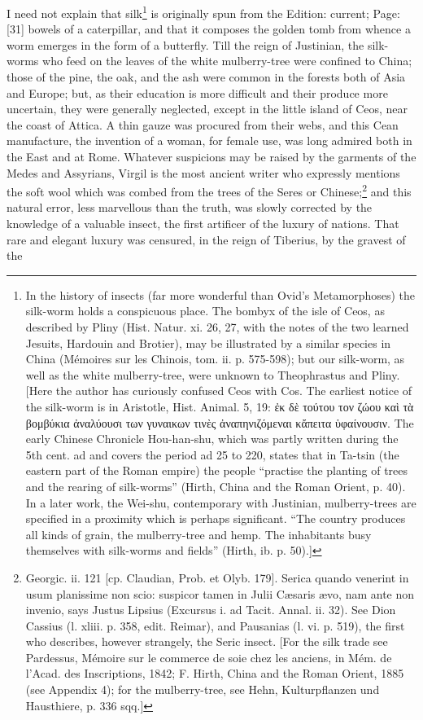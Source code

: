 I need not explain that silk\footnote{In the history of insects (far more wonderful than Ovid\texthebrew{}’s Metamorphoses) the silk-worm holds a conspicuous place. The bombyx of the isle of Ceos, as described by Pliny (Hist. Natur. xi. 26, 27, with the notes of the two learned Jesuits, Hardouin and Brotier), may be illustrated by a similar species in China (Mémoires sur les Chinois, tom. ii. p. 575-598); but our silk-worm, as well as the white mulberry-tree, were unknown to Theophrastus and Pliny. [Here the author has curiously confused Ceos with Cos. The earliest notice of the silk-worm is in Aristotle, Hist. Animal. 5, 19: \textgreek{\texthebrew{ἐ}κ δ\texthebrew{ὲ} τούτου τον ζώου κα\texthebrew{ὶ} τ\texthebrew{ὰ} βομβύκια \texthebrew{ἀ}ναλύουσι των γυναικων τιν\texthebrew{ὲ}ς \texthebrew{ἀ}ναπηνιζόμεναι κ\texthebrew{ἄ}πειτα \texthebrew{ὑ}φαίνουσιν}. The early Chinese Chronicle Hou-han-shu, which was partly written during the 5th cent. ad and covers the period ad 25 to 220, states that in Ta-tsin (the eastern part of the Roman empire) the people \texthebrew{“}practise the planting of trees and the rearing of silk-worms\texthebrew{}” (Hirth, China and the Roman Orient, p. 40). In a later work, the Wei-shu, contemporary with Justinian, mulberry-trees are specified in a proximity which is perhaps significant. \texthebrew{“}The country produces all kinds of grain, the mulberry-tree and hemp. The inhabitants busy themselves with silk-worms and fields\texthebrew{}” (Hirth, ib. p. 50).]} is originally spun from the Edition: current; Page: [31] bowels of a caterpillar, and that it composes the golden tomb from whence a worm emerges in the form of a butterfly. Till the reign of Justinian, the silk-worms who feed on the leaves of the white mulberry-tree were confined to China; those of the pine, the oak, and the ash were common in the forests both of Asia and Europe; but, as their education is more difficult and their produce more uncertain, they were generally neglected, except in the little island of Ceos, near the coast of Attica. A thin gauze was procured from their webs, and this Cean manufacture, the invention of a woman, for female use, was long admired both in the East and at Rome. Whatever suspicions may be raised by the garments of the Medes and Assyrians, Virgil is the most ancient writer who expressly mentions the soft wool which was combed from the trees of the Seres or Chinese;\footnote{Georgic. ii. 121 [cp. Claudian, Prob. et Olyb. 179]. Serica quando venerint in usum planissime non scio: suspicor tamen in Julii Cæsaris ævo, nam ante non invenio, says Justus Lipsius (Excursus i. ad Tacit. Annal. ii. 32). See Dion Cassius (l. xliii. p. 358, edit. Reimar), and Pausanias (l. vi. p. 519), the first who describes, however strangely, the Seric insect. [For the silk trade see Pardessus, Mémoire sur le commerce de soie chez les anciens, in Mém. de l\texthebrew{}’Acad. des Inscriptions, 1842; F. Hirth, China and the Roman Orient, 1885 (see Appendix 4); for the mulberry-tree, see Hehn, Kulturpflanzen und Hausthiere, p. 336 sqq.]} and this natural error, less marvellous than the truth, was slowly corrected by the knowledge of a valuable insect, the first artificer of the luxury of nations. That rare and elegant luxury was censured, in the reign of Tiberius, by the gravest of the 